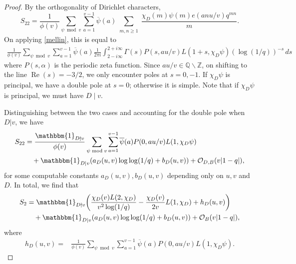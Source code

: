 \documentclass[11pt]{amsart}
\numberwithin{equation}{section}
\newcommand{\mb}{\mathbb}
\theoremstyle{remark}
\begin{document}
\begin{proof}
By the orthogonality of Dirichlet characters, 
\[
S_{22}
=
\frac{1}{\phi(v)}\sum_{\psi \bmod v} \sum_{a=1}^{v-1}\overline{\psi}(a)\sum_{\substack{m,n\geq 1}}
 \frac{\chi_D(m)\psi(m)e(anu/v)q^{mn}}{m}.
\]
On applying \eqref{mellin}, this is equal to
\begin{align}\label{Eq: Double Pole}
\frac{1}{\phi(v)}\sum_{\psi \bmod v} \sum_{a=1}^{v-1}\overline{\psi}(a)
\frac{1}{2\pi i }\int_{2-i\infty}^{2+i\infty}
\Gamma(s)P(s,au/v)L(1+s,\chi_D\psi)(\log(1/q))^{-s}\, ds
\end{align}
where $P(s,\alpha)$ is the periodic zeta function. Since $au/v\in \mb{Q}\backslash\mb{Z}$, on shifting to the line $\operatorname{Re}(s)=-3/2$, we only encounter poles at $s=0,-1$. If $\chi_D\psi$ is principal, we have a double pole at $s=0$; otherwise it is simple. Note that if $\chi_D\psi$ is principal, we must have $D \mid v$. 

Distinguishing between the two cases and accounting for the double pole when $D|v$, we have
\begin{align*}
S_{22}& =
\frac{\mathbbm{1}_{D\nmid v}}{\phi(v)}\sum_{\psi \bmod v} \sum_{a=1}^{v-1}\overline{\psi}(a)P(0,au/v)L(1,\chi_D\psi)
\\
&\quad +
\mathbbm{1}_{D| v}(a_D(u,v)\log\log(1/q)+b_D(u,v))
+
\mathcal{O}_{D,B}(v|1-q|),
\end{align*}
for some computable constants $a_D(u,v),b_D(u,v)$ depending only on $u,v$ and $D$. In total, we  find that 
\begin{align}\label{S2}
S_2
&=
\mathbbm{1}_{D\nmid v} \bigg(\frac{\chi_D(v)L(2,\chi_D)}{v^2\log(1/q)}
-\frac{\chi_D(v)}{2v}
L(1,\chi_D)
+
h_D(u,v)\bigg) \notag\\
&\quad +
\mathbbm{1}_{D| v}(a_D(u,v)\log\log(1/q)+b_D(u,v))
+\mathcal{O}_B(v|1-q|),
\end{align}
where 
\begin{align*}
h_D(u,v)
= &
\frac{1}{\phi(v)}\sum_{\psi \bmod v} \sum_{a=1}^{v-1}\overline{\psi}(a)P(0,au/v)L(1,\chi_D\psi).
\end{align*}


\end{proof}
\end{document}
